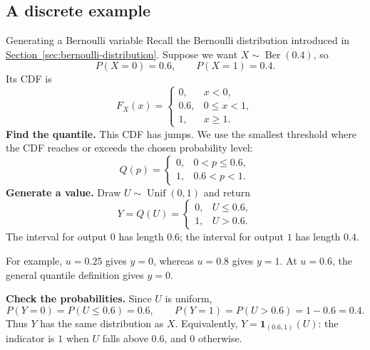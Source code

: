 \documentclass[a4paper,12pt,oneside]{report}
\begin{document}
\subsection{A discrete example}
\begin{framedexample}{Generating a Bernoulli variable}
Recall the Bernoulli distribution introduced in
\hyperref[sec:bernoulli-distribution]{Section~\ref{sec:bernoulli-distribution}}.
Suppose we want $X\sim\operatorname{Ber}(0.4)$, so
\[
  P(X=0)=0.6,\qquad P(X=1)=0.4.
\]
Its CDF is
\[
  F_X(x)=
  \begin{cases}
    0, & x<0,\\
    0.6, & 0\leq x<1,\\
    1, & x\geq1.
  \end{cases}
\]
\textbf{Find the quantile.} This CDF has jumps. We use the smallest
threshold where the CDF reaches or exceeds the chosen probability
level:
\[
  Q(p)=
  \begin{cases}
    0, & 0<p\leq0.6,\\
    1, & 0.6<p<1.
  \end{cases}
\]
\textbf{Generate a value.} Draw $U\sim\operatorname{Unif}(0,1)$
and return
\[
  Y=Q(U)=
  \begin{cases}
    0, & U\leq0.6,\\
    1, & U>0.6.
  \end{cases}
\]
The interval for output $0$ has length $0.6$; the interval for
output $1$ has length $0.4$.
\begin{center}
\end{center}
For example, $u=0.25$ gives $y=0$, whereas $u=0.8$ gives $y=1$.
At $u=0.6$, the general quantile definition gives $y=0$.

\textbf{Check the probabilities.} Since $U$ is uniform,
\[
  P(Y=0)=P(U\leq0.6)=0.6,\qquad
  P(Y=1)=P(U>0.6)=1-0.6=0.4.
\]
Thus $Y$ has the same distribution as $X$. Equivalently,
$Y=\mathbf 1_{(0.6,1)}(U)$: the indicator is $1$ when $U$ falls
above $0.6$, and $0$ otherwise.
\end{framedexample}
\end{document}
